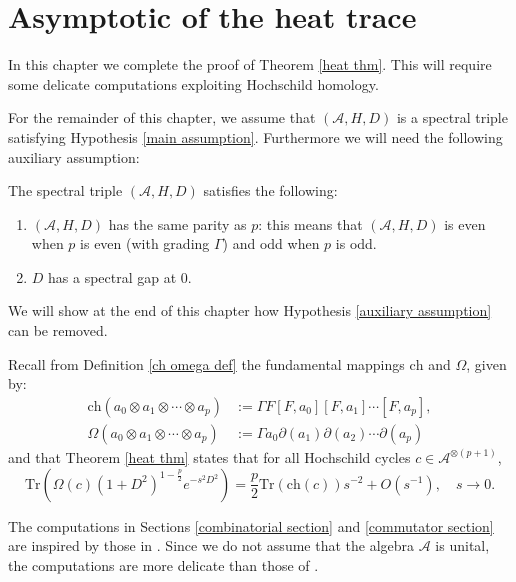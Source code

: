 \chapter{Asymptotic of the heat trace}\label{heat chapter}
    
    In this chapter we complete the proof of Theorem \ref{heat thm}. This will require some delicate computations 
    exploiting Hochschild homology.
    
    For the remainder of this chapter, we assume that $(\mathcal{A},H,D)$ is a spectral triple satisfying Hypothesis \ref{main assumption}.
    Furthermore we will need the following auxiliary assumption:
    \begin{hyp}\label{auxiliary assumption}
        The spectral triple $(\mathcal{A},H,D)$ satisfies the following:
        \begin{enumerate}[{\rm (i)}]
            \item{}\label{aux ass0} $(\mathcal{A},H,D)$ has the same parity as $p$: this means that $(\mathcal{A},H,D)$ is even when $p$ is even (with grading $\Gamma$) and odd when $p$ is odd.
            \item{}\label{aux ass1} $D$ has a spectral gap at $0$.
        \end{enumerate}
    \end{hyp}
    We will show at the end of this chapter how Hypothesis \ref{auxiliary assumption} can be removed.
    
    Recall from Definition \ref{ch omega def} the fundamental mappings $\mathrm{ch}$ and $\Omega$, given by:
    \begin{align*}
        \mathrm{ch}(a_0\otimes a_1\otimes\cdots\otimes a_p) &:= \Gamma F[F,a_0][F,a_1]\cdots[F,a_p],\\
        \Omega(a_0\otimes a_1\otimes\cdots\otimes a_p) &:= \Gamma a_0\partial(a_1)\partial(a_2)\cdots \partial(a_p)
    \end{align*}
    and that Theorem \ref{heat thm} states that for all Hochschild cycles $c \in \mathcal{A}^{\otimes(p+1)}$,
    \begin{equation*}
        \mathrm{Tr}(\Omega(c)(1+D^2)^{1-\frac{p}{2}}e^{-s^2D^2}) = \frac{p}{2}\mathrm{Tr}(\mathrm{ch}(c))s^{-2}+O(s^{-1}),\quad s\to 0.
    \end{equation*}
    
    The computations in Sections \ref{combinatorial section} and \ref{commutator section} are {inspired by those in \cite{CPRS1,CRSZ}. Since
    we do not assume that the algebra $\mathcal{A}$ is unital, the computations are more delicate than those of \cite{CPRS1,CRSZ}.}

